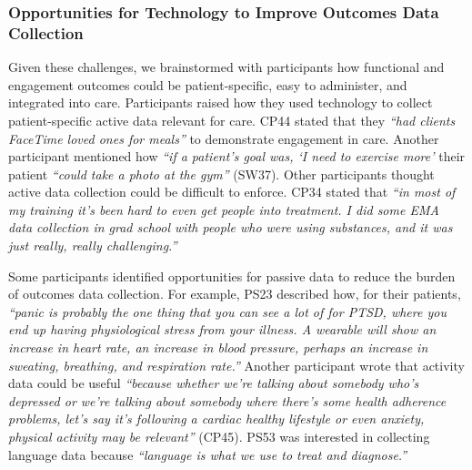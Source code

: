 \subsubsection{Opportunities for Technology to Improve Outcomes Data Collection}
\label{sec:findings:collection:opportunities}

Given these challenges, we brainstormed with participants how functional and engagement outcomes could be patient-specific, easy to administer, and integrated into care.
Participants raised how they used technology to collect patient-specific active data relevant for care.
CP44 stated that they \textit{``had clients FaceTime loved ones for meals''} to demonstrate engagement in care.
Another participant mentioned how \textit{``if a patient's goal was, `I need to exercise more'} their patient \textit{``could take a photo at the gym''} (SW37).
Other participants thought active data collection could be difficult to enforce.
CP34 stated that \textit{``in most of my training it's been hard to even get people into treatment. I did some EMA data collection in grad school with people who were using substances, and it was just really, really challenging.''}

Some participants identified opportunities for passive data to reduce the burden of outcomes data collection.
For example, PS23 described how, for their patients, \textit{``panic is probably the one thing that you can see a lot of for PTSD, where you end up having physiological stress from your illness. A wearable will show an increase in heart rate, an increase in blood pressure, perhaps an increase in sweating, breathing, and respiration rate.''}
Another participant wrote that activity data could be useful \textit{``because whether we're talking about somebody who's depressed or we're talking about somebody where there's some health adherence problems, let's say it's following a cardiac healthy lifestyle or even anxiety, physical activity may be relevant''} (CP45).
PS53 was interested in collecting language data because \textit{``language is what we use to treat and diagnose.''} 

